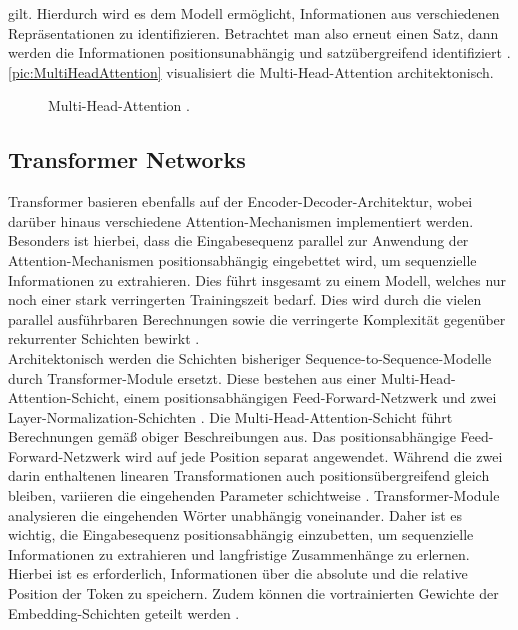 \noindent
gilt. Hierdurch wird es dem Modell ermöglicht, Informationen aus verschiedenen Repräsentationen zu identifizieren. Betrachtet man also erneut einen Satz, dann werden die Informationen positionsunabhängig und satzübergreifend identifiziert \cite[S.~4-5]{VAS17}. \autoref{pic:MultiHeadAttention} visualisiert die Multi-Head-Attention architektonisch.
\newpage

\begin{figure}[h!]
  \centering
  \caption{Multi-Head-Attention \cite[S.~400]{ZHA20}.}
  \label{pic:MultiHeadAttention}
\end{figure}


\subsection{Transformer Networks}
\noindent
Transformer basieren ebenfalls auf der Encoder-Decoder-Architektur, wobei darüber hinaus verschiedene Attention-Mechanismen implementiert werden. Besonders ist hierbei, dass die Eingabesequenz parallel zur Anwendung der Attention-Mechanismen positionsabhängig eingebettet wird, um sequenzielle Informationen zu extrahieren. Dies führt insgesamt zu einem Modell, welches nur noch einer stark verringerten Trainingszeit bedarf. Dies wird durch die vielen parallel ausführbaren Berechnungen sowie die verringerte Komplexität gegenüber rekurrenter Schichten bewirkt \cite[S.~5-6]{VAS17}.\\

\noindent
Architektonisch werden die Schichten bisheriger Sequence-to-Sequence-Modelle durch Transformer-Module ersetzt. Diese bestehen aus einer Multi-Head-Attention-Schicht, einem positionsabhängigen Feed-Forward-Netzwerk und zwei Layer-Normalization-Schichten \cite[S.~3]{VAS17}. Die Multi-Head-Attention-Schicht führt Berechnungen gemäß obiger Beschreibungen aus. Das positionsabhängige Feed-Forward-Netzwerk wird auf jede Position separat angewendet. Während die zwei darin enthaltenen linearen Transformationen auch positionsübergreifend gleich bleiben, variieren die eingehenden Parameter schichtweise \cite[S.~4]{VAS17}. Transformer-Module analysieren die eingehenden Wörter unabhängig voneinander. Daher ist es wichtig, die Eingabesequenz positionsabhängig einzubetten, um sequenzielle Informationen zu extrahieren und langfristige Zusammenhänge zu erlernen. Hierbei ist es erforderlich, Informationen über die absolute und die relative Position der Token zu speichern. Zudem können die vortrainierten Gewichte der Embedding-Schichten geteilt werden \cite[S.~5-6]{VAS17}.
\newpage

